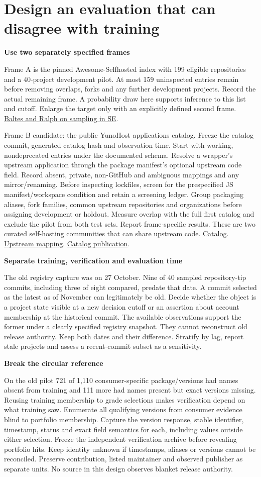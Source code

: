 \documentclass[11pt,a4paper]{article}
\newcommand{\pg}[1]{\newpage\section{\color{ink}#1}}
\newcommand{\hd}[1]{\par\textbf{\color{accent}#1}\par\nopagebreak}
\begin{document}
\pg{Design an evaluation that can disagree with training}
\hd{Use two separately specified frames}
Frame A is the pinned Awesome-Selfhosted index with 199 eligible repositories and a 40-project development pilot. At most 159 uninspected entries remain before removing overlaps, forks and any further development projects. Record the actual remaining frame. A probability draw here supports inference to this list and cutoff. Enlarge the target only with an explicitly defined second frame. \href{https://assets.empirical-software.engineering/pdf/emse22-sampling.pdf}{Baltes and Ralph on sampling in SE}.

Frame B candidate: the public YunoHost applications catalog. Freeze the catalog commit, generated catalog hash and observation time. Start with working, nondeprecated entries under the documented schema. Resolve a wrapper's upstream application through the package manifest's optional upstream code field. Record absent, private, non-GitHub and ambiguous mappings and any mirror/renaming. Before inspecting lockfiles, screen for the prespecified JS manifest/workspace condition and retain a screening ledger. Group packaging aliases, fork families, common upstream repositories and organizations before assigning development or holdout. Measure overlap with the full first catalog and exclude the pilot from both test sets. Report frame-specific results. These are two curated self-hosting communities that can share upstream code. \href{https://github.com/YunoHost/apps}{Catalog}. \href{https://doc.yunohost.org/en/dev/packaging/manifest/}{Upstream mapping}. \href{https://doc.yunohost.org/en/dev/packaging/publish/}{Catalog publication}.

\hd{Separate training, verification and evaluation time}
The old registry capture was on 27 October. Nine of 40 sampled repository-tip commits, including three of eight compared, predate that date. A commit selected as the latest as of November can legitimately be old. Decide whether the object is a project state visible at a new decision cutoff or an assertion about account membership at the historical commit. The available observations support the former under a clearly specified registry snapshot. They cannot reconstruct old release authority. Keep both dates and their difference. Stratify by lag, report stale projects and assess a recent-commit subset as a sensitivity.

\hd{Break the circular reference}
On the old pilot 721 of 1,110 consumer-specific package/versions had names absent from training and 111 more had names present but exact versions missing. Reusing training membership to grade selections makes verification depend on what training saw. Enumerate all qualifying versions from consumer evidence blind to portfolio membership. Capture the version response, stable identifier, timestamp, status and exact field semantics for each, including values outside either selection. Freeze the independent verification archive before revealing portfolio hits. Keep identity unknown if timestamps, aliases or versions cannot be reconciled. Preserve contribution, listed maintainer and observed publisher as separate units. No source in this design observes blanket release authority.
\end{document}
